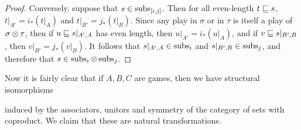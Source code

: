 \begin{proof}
  Conversely, suppose that $s\in\operatorname{subs}_{[i,j]}$.  
  Then for all even-length $t\sqsubseteq s$, $t\vert_{A'}=i_*(t\vert_{A})$ and $t\vert_{B'}=j_*(t\vert_{B})$.  
  Since any play in $\sigma$ or in $\tau$ is itself a play of $\sigma\otimes\tau$, then if $u\sqsubseteq s\vert_{A',A}$ has even length, then $u\vert_{A'}=i_*(u\vert_{A})$, and if $v\sqsubseteq s\vert_{B',B}$, then $v\vert_{B'}=j_*(v\vert_{B})$.  
  It follows that $s\vert_{A',A}\in \operatorname{subs}_i$ and $s\vert_{B',B}\in\operatorname{subs}_j$, and therefore that $s\in \operatorname{subs}_i\otimes\operatorname{subs}_j$.  
\end{proof}

Now it is fairly clear that if $A,B,C$ are games, then we have structural isomorphisms
induced by the associators, unitors and symmetry of the category of sets with coproduct.
We claim that these are natural transformations.


